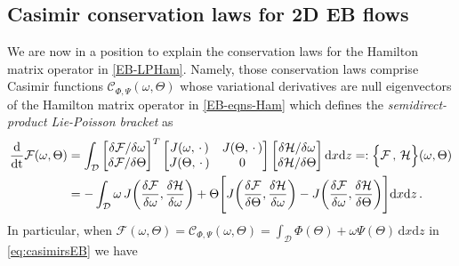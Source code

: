 \documentclass[11pt, oneside]{article}   	%
\numberwithin{equation}{section}
\theoremstyle{plain}
\theoremstyle{definition}
\theoremstyle{remark}
\newcommand{\<}{\langle}
\renewcommand{\>}{\rangle}
\def\dt{\textnormal{dt}}
\newcommand{\mc}[1]{\mathcal{#1}}
\begin{document}
\subsection{Casimir conservation laws for 2D EB flows}\label{subsec: Casimirs} 
We are now in a position to explain the conservation laws for the Hamilton matrix operator in \eqref{EB-LPHam}. Namely, those conservation laws comprise Casimir functions $\mc{C}_{\Phi,\Psi}(\omega,\Theta)$ whose variational derivatives are null eigenvectors of the Hamilton matrix operator in \eqref{EB-eqns-Ham} which defines the \emph{semidirect-product Lie-Poisson bracket} as
 \begin{align}
  \begin{split}
 \frac{\mathrm{d}}{\dt} \mc{F}(\omega,\Theta)
 &=
\int_{\mathcal D}
\begin{bmatrix}
{\delta \mc F}/{\delta \omega} 
\\ 
{\delta \mc F}/{\delta \Theta} 
\end{bmatrix}^T
\begin{bmatrix}
J(\omega,\,\cdot\,) & J(\Theta,\,\cdot\,) 
\\ 
J(\Theta,\,\cdot\,)  & 0
\end{bmatrix}
\begin{bmatrix}
{\delta \mathcal{H}}/{\delta \omega} 
\\ 
{\delta \mathcal{H}}/{\delta \Theta} 
\end{bmatrix}
\mathrm{d}x\mathrm{d}z
=:
\Big\{\mc F\,,\,{\mathcal{H}}\Big\}(\omega,\Theta)
\\&=-
\int_{\mathcal D} 
\omega \,J\bigg(\frac{\delta \mc F}{\delta \omega},\frac{\delta \mathcal{H}}{\delta \omega}\bigg)
+ \Theta \Bigg[J\bigg(\frac{\delta \mc F}{\delta \Theta},\frac{\delta \mathcal{H}}{\delta \omega}\bigg)
- J\bigg(\frac{\delta \mc F}{\delta \omega},\frac{\delta \mathcal{H}}{\delta \Theta}\bigg)\Bigg] \mathrm{d}x\mathrm{d}z
\,.
\end{split}
\label{EB-brkt3}
\end{align}
In particular, when $\mc{F}(\omega,\Theta)=\mc{C}_{\Phi,\Psi}(\omega,\Theta)= \int_{\mathcal D}\Phi(\Theta ) + \omega \Psi(\Theta )\,\mathrm{d}x\mathrm{d}z$ in \eqref{eq:casimirsEB} we have   
\end{document}
